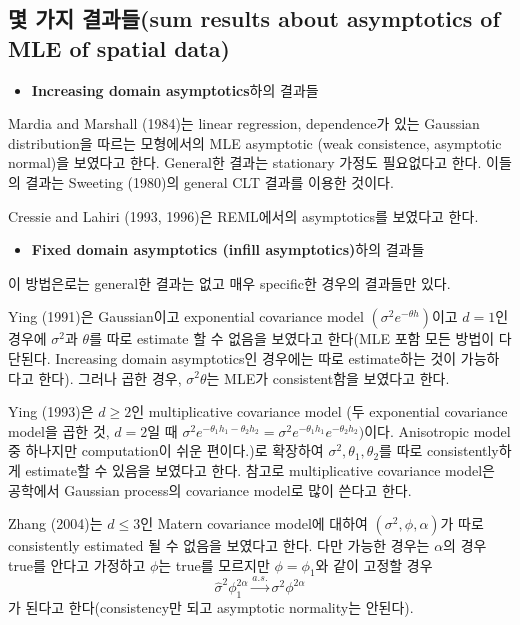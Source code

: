 \documentclass[b5paper,]{scrbook}
\providecommand{\tightlist}{%
  \setlength{\itemsep}{0pt}\setlength{\parskip}{0pt}}
\theoremstyle{plain}
\theoremstyle{definition}
\numberwithin{equation}{section}
\begin{document}
\subsection{몇 가지 결과들(sum results about asymptotics of MLE of
spatial
data)}\label{--sum-results-about-asymptotics-of-mle-of-spatial-data}

\begin{itemize}
\tightlist
\item
  \textbf{Increasing domain asymptotics}하의 결과들
\end{itemize}

Mardia and Marshall (1984)는 linear regression, dependence가 있는
Gaussian distribution을 따르는 모형에서의 MLE asymptotic (weak
consistence, asymptotic normal)을 보였다고 한다. General한 결과는
stationary 가정도 필요없다고 한다. 이들의 결과는 Sweeting (1980)의
general CLT 결과를 이용한 것이다.

Cressie and Lahiri (1993, 1996)은 REML에서의 asymptotics를 보였다고
한다.

\begin{itemize}
\tightlist
\item
  \textbf{Fixed domain asymptotics (infill asymptotics)}하의 결과들
\end{itemize}

이 방법은로는 general한 결과는 없고 매우 specific한 경우의 결과들만
있다.

Ying (1991)은 Gaussian이고 exponential covariance model
\((\sigma^{2}e^{-\theta h})\)이고 \(d=1\)인 경우에 \(\sigma^{2}\)과
\(\theta\)를 따로 estimate 할 수 없음을 보였다고 한다(MLE 포함 모든
방법이 다 단된다. Increasing domain asymptotics인 경우에는 따로
estimate하는 것이 가능하다고 한다). 그러나 곱한 경우,
\(\sigma^{2}\theta\)는 MLE가 consistent함을 보였다고 한다.

Ying (1993)은 \(d \geq 2\)인 multiplicative covariance model (두
exponential covariance model을 곱한 것, \(d=2\)일 때
\(\sigma^{2}e^{-\theta_{1} h_{1}-\theta_{2}h_{2}}=\sigma^{2}e^{-\theta_{1}h_{1}}e^{-\theta_{2}h_{2}})\)이다.
Anisotropic model 중 하나지만 computation이 쉬운 편이다.)로 확장하여
\(\sigma^{2}, \theta_{1}, \theta_{2}\)를 따로 consistently하게
estimate할 수 있음을 보였다고 한다. 참고로 multiplicative covariance
model은 공학에서 Gaussian process의 covariance model로 많이 쓴다고 한다.

Zhang (2004)는 \(d \leq 3\)인 Matern covariance model에 대하여
\((\sigma^{2}, \phi, \alpha)\)가 따로 consistently estimated 될 수
없음을 보였다고 한다. 다만 가능한 경우는 \(\alpha\)의 경우 true를 안다고
가정하고 \(\phi\)는 true를 모르지만 \(\phi=\phi_{1}\)와 같이 고정할 경우
\[\hat{\sigma}^{2}\phi_{1}^{2\alpha} \stackrel{a.s.}{\rightarrow} \sigma^{2}\phi^{2\alpha}\]
가 된다고 한다(consistency만 되고 asymptotic normality는 안된다).
\end{document}
